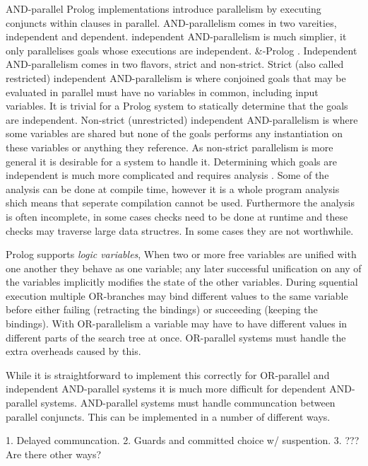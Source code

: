 AND-parallel Prolog implementations introduce parallelism by executing
conjuncts within clauses in parallel.
AND-parallelism comes in two vareities, independent and dependent.
independent AND-parallelism is much simplier, it only parallelises goals
whose executions are independent.
\&-Prolog 
\citep{Hermenegildo:1991:and-parallel,
DBLP:journals/jlp/MuthukumarBBH99}.
Independent AND-parallelism comes in two flavors, strict and non-strict.
Strict (also called restricted) independent AND-parallelism is where
conjoined goals that may be evaluated in parallel must have no variables in
common, including input variables.
It is trivial for a Prolog system to statically determine that the goals are
independent.
Non-strict (unrestricted) independent AND-parallelism is where some variables
are shared but none of the goals performs any instantiation on these variables
or anything they reference.
As non-strict parallelism is more general it is desirable for a system to
handle it.
Determining which goals are independent is much more complicated and
requires analysis 
\citep{DBLP:journals/tcs/GrasH09, Hermenegildo1995}.
Some of the analysis can be done at compile time, however it is a whole program analysis shich means that seperate compilation cannot be used.
Furthermore the analysis is often incomplete,
in some cases checks need to be done at runtime and these checks may traverse
large data structres.
In some cases they are not worthwhile.

Prolog supports \emph{logic variables},
When two or more free variables are unified with one another they behave as one
variable;
any later successful unification on any of the variables implicitly modifies
the state of the other variables.
During squential execution multiple OR-branches may bind different values to
the same variable before either failing (retracting the bindings) 
or succeeding (keeping the bindings).
With OR-parallelism a variable may have to have different values in different
parts of the search tree at once.
OR-parallel systems must handle the extra overheads caused by this.

While it is straightforward to implement this correctly for OR-parallel
and independent AND-parallel systems it is much more difficult for
dependent AND-parallel systems.
AND-parallel systems must handle communcation between parallel conjuncts.
This can be implemented in a number of different ways.

1. Delayed communcation.
2. Guards and committed choice w/ suspention.
3. ??? Are there other ways?

